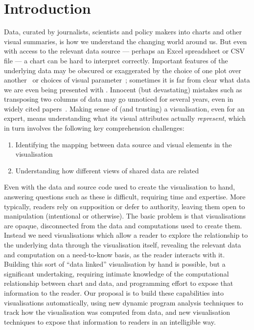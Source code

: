 \section{Introduction}

Data, curated by journalists, scientists and policy makers into charts and other visual summaries, is how we understand the changing world around us. But even with access to the relevant data source --- perhaps an Excel spreadsheet or CSV file --- a chart can be hard to interpret correctly. Important features of the underlying data may be obscured or exaggerated by the choice of one plot over another~\cite{weissgerber15} or choices of visual parameter~\cite{correll19}; sometimes it is far from clear what data we are even being presented with \cite{fullfact19}. Innocent (but devastating) mistakes such as transposing two columns of data may go unnoticed for several years, even in widely cited papers~\cite{miller06}. Making sense of (and trusting) a visualisation, even for an expert, means understanding what its visual attributes actually \emph{represent}, which in turn involves the following key comprehension challenges:

\begin{enumerate}
  \item Identifying the mapping between data source and visual elements in the visualisation
  \item Understanding how different views of shared data are related
\end{enumerate}

\noindent Even with the data and source code used to create the visualisation to hand, answering questions such as these is difficult, requiring time and expertise. More typically, readers rely on supposition or defer to authority, leaving them open to manipulation (intentional or otherwise). The basic problem is that visualisations are opaque, disconnected from the data and computations used to create them. Instead we need visualisations which allow a reader to explore the relationship to the underlying data through the visualisation itself, revealing the relevant data and computation on a need-to-know basis, as the reader interacts with it. Building this sort of ``data linked'' visualisation by hand is possible, but a significant undertaking, requiring intimate knowledge of the computational relationship between chart and data, and programming effort to expose that information to the reader. Our proposal is to build these capabilities into visualisations automatically, using new dynamic program analysis techniques to track how the visualisation was computed from data, and new visualisation techniques to expose that information to readers in an intelligible way.

